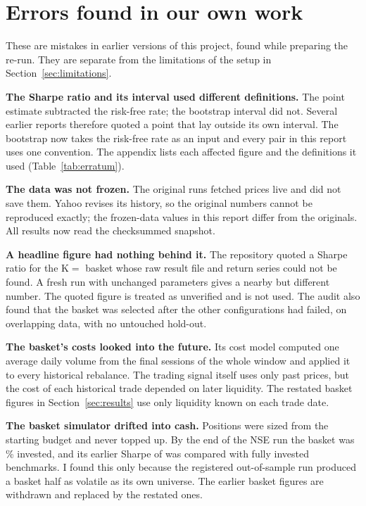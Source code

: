 \section{Errors found in our own work}\label{sec:errors}
These are mistakes in earlier versions of this project, found while preparing the re-run. They are separate from the limitations of the setup in Section~\ref{sec:limitations}.

\textbf{The Sharpe ratio and its interval used different definitions.} The point estimate subtracted the risk-free rate; the bootstrap interval did not. Several earlier reports therefore quoted a point that lay outside its own interval. The bootstrap now takes the risk-free rate as an input and every pair in this report uses one convention. The appendix lists each affected figure and the definitions it used (Table~\ref{tab:erratum}).

\textbf{The data was not frozen.} The original runs fetched prices live and did not save them. Yahoo revises its history, so the original numbers cannot be reproduced exactly; the frozen-data values in this report differ from the originals. All results now read the checksummed snapshot.

\textbf{A headline figure had nothing behind it.} The repository quoted a Sharpe ratio for the K$=$\BasketK{} basket whose raw result file and return series could not be found. A fresh run with unchanged parameters gives a nearby but different number. The quoted figure is treated as unverified and is not used. The audit also found that the basket was selected after the other configurations had failed, on overlapping data, with no untouched hold-out.

\textbf{The basket's costs looked into the future.} Its cost model computed one average daily volume from the final sessions of the whole window and applied it to every historical rebalance. The trading signal itself uses only past prices, but the cost of each historical trade depended on later liquidity. The restated basket figures in Section~\ref{sec:results} use only liquidity known on each trade date.

\textbf{The basket simulator drifted into cash.} Positions were sized from the starting budget and never topped up. By the end of the NSE run the basket was \LegacyBasketInvestedEnd\% invested, and its earlier Sharpe of \LegacyBasketSharpeExcess{} was compared with fully invested benchmarks. I found this only because the registered out-of-sample run produced a basket half as volatile as its own universe. The earlier basket figures are withdrawn and replaced by the restated ones.

